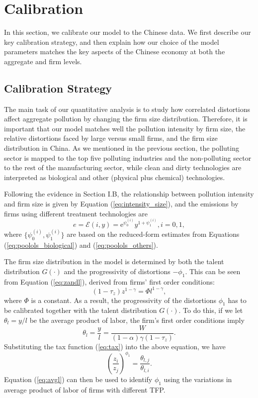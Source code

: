 \documentclass[AEJ]{AEA}
\begin{document}
\section{Calibration}
\label{sec:calibration}

In this section, we calibrate our model to the Chinese data. We first describe our key calibration strategy, and then explain how our choice of the model parameters matches the key aspects of the Chinese economy at both the aggregate and firm levels.

\subsection{Calibration Strategy}

The main task of our quantitative analysis is to study how correlated distortions affect aggregate pollution by changing the firm size distribution. Therefore, it is important that our model matches well the pollution intensity by firm size, the relative distortions faced by large versus small firms, and the firm size distribution in China. As we mentioned in the previous section, the polluting sector is mapped to the top five polluting industries and the non-polluting sector to the rest of the manufacturing sector, while clean and dirty technologies are interpreted as biological and other (physical plus chemical) technologies.

Following the evidence in Section I.B, the relationship between pollution intensity and firm size is given by Equation (\ref{eq:intensity_size}), and the emissions by firms using different treatment technologies are
\begin{equation*}
    e = \mathcal{E}(i,y) = \mathrm{e}^{\psi_0^{(i)}} y^{1+\psi_1^{(i)}}, i=0,1,
\end{equation*}
where $\{\psi_0^{(i)}, \psi_1^{(i)}\}$ are based on the reduced-form estimates from Equations (\ref{eq:poolols_biological}) and (\ref{eq:poolols_others}).

The firm size distribution in the model is determined by {both} the talent distribution $G(\cdot)$ and the progressivity of distortions $-\phi_1$. This can be seen from Equation (\ref{eq:zandl}), derived from firms' first order conditions:
\begin{equation}
\label{eq:zandl}
    (1-\tau_z)z^{1-\gamma} = \Phi l^{1-\gamma},
\end{equation}
where $\Phi$ is a constant. As a result, the progressivity of the distortions $\phi_1$ has to be calibrated together with the talent distribution $G(\cdot)$. To do this, if we let $\theta_l = y/l$ be the average product of labor, the firm's first order conditions imply
\begin{equation*}
    \theta_l = \frac{y}{l} = \frac{W}{(1-\alpha)\gamma(1-\tau_z)}.
\end{equation*}
Substituting the tax function (\ref{eq:tax}) into the above equation, we have
\begin{equation}
\label{eq:avgl}
    \left(\frac{z_i}{z_j} \right)^{\phi_1} = \frac{\theta_{l,j}}{\theta_{l,i}}.
\end{equation}
Equation (\ref{eq:avgl}) can then be used to identify $\phi_1$ using the variations in average product of labor of firms with different TFP.
\end{document}
